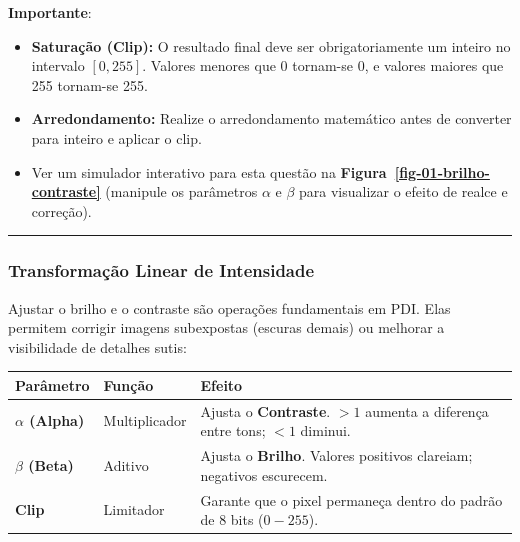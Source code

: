 \documentclass[
  portuguese,
  letterpaper,
  openany,
  oneside,
  12pt,
  a4paper]{book}
\providecommand{\tightlist}{%
  \setlength{\itemsep}{0pt}\setlength{\parskip}{0pt}}
\begin{document}
 \textbf{Importante}:

\begin{itemize}
\tightlist
\item
  \textbf{Saturação (Clip):} O resultado final deve ser obrigatoriamente
  um inteiro no intervalo \([0, 255]\). Valores menores que 0 tornam-se
  0, e valores maiores que 255 tornam-se 255.
\item
  \textbf{Arredondamento:} Realize o arredondamento matemático antes de
  converter para inteiro e aplicar o clip.
\item
  Ver um simulador interativo para esta questão na
  \textbf{Figura~\ref{fig-01-brilho-contraste}} (manipule os parâmetros
  \(\alpha\) e \(\beta\) para visualizar o efeito de realce e correção).
\end{itemize}

\begin{center}\rule{0.5\linewidth}{0.5pt}\end{center}

\subsubsection{\texorpdfstring{ Transformação Linear de
Intensidade}{ Transformação Linear de Intensidade}}\label{transformauxe7uxe3o-linear-de-intensidade}

Ajustar o brilho e o contraste são operações fundamentais em PDI. Elas
permitem corrigir imagens subexpostas (escuras demais) ou melhorar a
visibilidade de detalhes sutis:

\begin{longtable}[]{@{}
  >{\raggedright\arraybackslash}p{}
  >{\raggedright\arraybackslash}p{}
  >{\raggedright\arraybackslash}p{}@{}}
\toprule\noalign{}
\begin{minipage}[b]{\linewidth}\raggedright
Parâmetro
\end{minipage} & \begin{minipage}[b]{\linewidth}\raggedright
Função
\end{minipage} & \begin{minipage}[b]{\linewidth}\raggedright
Efeito
\end{minipage} \\
\midrule\noalign{}
\endhead
\bottomrule\noalign{}
\endlastfoot
\textbf{\(\alpha\) (Alpha)} & Multiplicador & Ajusta o
\textbf{Contraste}. \(>1\) aumenta a diferença entre tons; \(<1\)
diminui. \\
\textbf{\(\beta\) (Beta)} & Aditivo & Ajusta o \textbf{Brilho}. Valores
positivos clareiam; negativos escurecem. \\
\textbf{Clip} & Limitador & Garante que o pixel permaneça dentro do
padrão de 8 bits (\(0-255\)). \\
\end{longtable}
\end{document}
